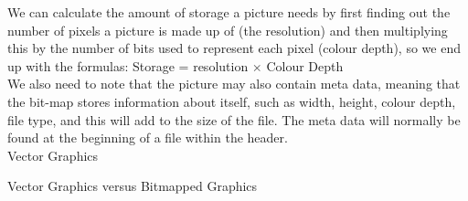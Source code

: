   We can calculate the amount of storage a picture needs by first finding out the number of pixels a picture is made up of (the resolution) and then multiplying this by the number of bits used to represent each pixel (colour depth), so we end up with the formulas: Storage = resolution $\times$ Colour Depth \\
  We also need to note that the picture may also contain meta data, meaning that the bit-map stores information about itself, such as width, height, colour depth, file type, and this will add to the size of the file. The meta data will normally be found at the beginning of a file within the header.\\
  
  \noindent
  Vector Graphics
  
  \noindent
  Vector Graphics versus Bitmapped Graphics
  
